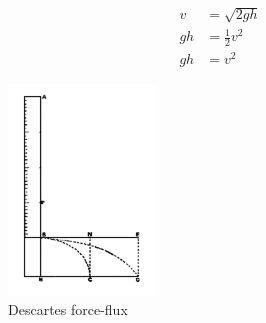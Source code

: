 \documentclass{article}
\begin{document}
\begin{align}
  v & = \sqrt{2gh} \label{eqn:efflux} \\
  gh & = \frac{1}{2}v^{2} \label{eqn:viva} \\
  gh & = v^{2} \label{eqn:vivas}
\end{align}


\begin{figure}[h]
  \begin{center}
    \includegraphics[width=0.35\textwidth]{DescartesWaterFlow} %
    \caption{Descartes force-flux}
    \label{fig:DescartesWaterFlow}
  \end{center}
\end{figure}
\end{document}
